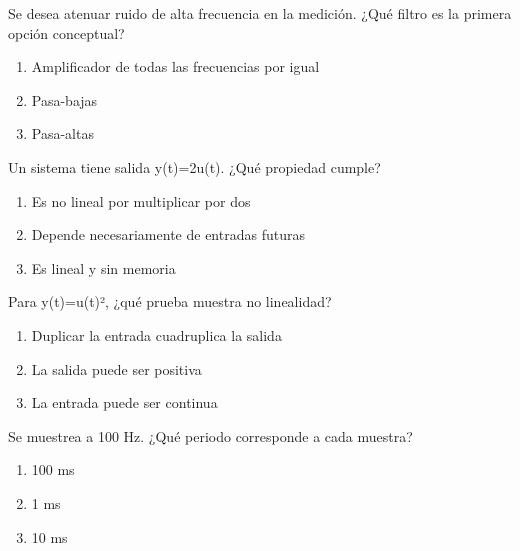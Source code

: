 \noindent\begin{minipage}{\linewidth}\setlength{\parskip}{4pt}\label{q:H-086}
Se desea atenuar ruido de alta frecuencia en la medición. ¿Qué filtro es la primera opción conceptual?
\begin{enumerate}[label=\Alph*),nosep]
\item Amplificador de todas las frecuencias por igual
\item Pasa-bajas
\item Pasa-altas
\end{enumerate}\end{minipage}\par\medskip

\noindent\begin{minipage}{\linewidth}\setlength{\parskip}{4pt}\label{q:H-087}
Un sistema tiene salida y(t)=2u(t). ¿Qué propiedad cumple?
\begin{enumerate}[label=\Alph*),nosep]
\item Es no lineal por multiplicar por dos
\item Depende necesariamente de entradas futuras
\item Es lineal y sin memoria
\end{enumerate}\end{minipage}\par\medskip

\noindent\begin{minipage}{\linewidth}\setlength{\parskip}{4pt}\label{q:H-088}
Para y(t)=u(t)², ¿qué prueba muestra no linealidad?
\begin{enumerate}[label=\Alph*),nosep]
\item Duplicar la entrada cuadruplica la salida
\item La salida puede ser positiva
\item La entrada puede ser continua
\end{enumerate}\end{minipage}\par\medskip

\noindent\begin{minipage}{\linewidth}\setlength{\parskip}{4pt}\label{q:H-089}
Se muestrea a 100 Hz. ¿Qué periodo corresponde a cada muestra?
\begin{enumerate}[label=\Alph*),nosep]
\item 100 ms
\item 1 ms
\item 10 ms
\end{enumerate}\end{minipage}\par\medskip

